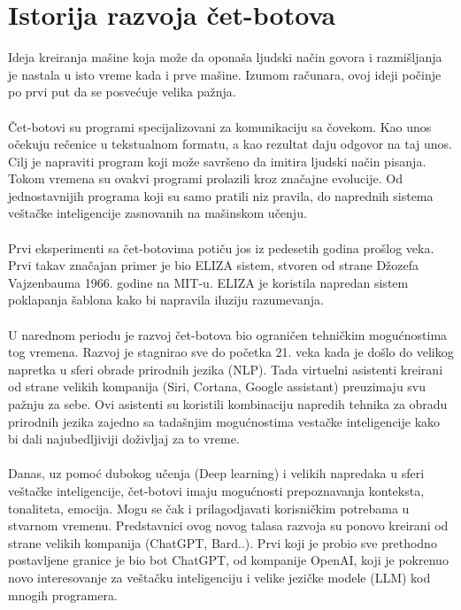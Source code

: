 \documentclass[fleqn, 12pt]{article}
\begin{document}


\setcounter{tocdepth}{2}
\tableofcontents

\newpage

\section{Istorija razvoja čet-botova}
\begin{text}
Ideja kreiranja mašine koja može da oponaša ljudski način govora i razmišljanja je nastala u isto vreme kada i prve mašine. Izumom računara, ovoj ideji počinje po prvi put da se posvećuje velika pažnja.\cite{G1}
\\\\
Čet-botovi su programi specijalizovani za komunikaciju sa čovekom. Kao unos očekuju rečenice u tekstualnom formatu, a kao rezultat daju odgovor na taj unos. Cilj je napraviti program koji može savršeno da imitira ljudski način pisanja. Tokom vremena su ovakvi programi prolazili kroz značajne evolucije. Od jednostavnijih programa koji su samo pratili niz pravila, do naprednih sistema veštačke inteligencije zasnovanih na mašinskom učenju. \cite{G1}
\\\\
Prvi eksperimenti sa čet-botovima potiču jos iz pedesetih godina prošlog veka. Prvi takav značajan primer je bio ELIZA sistem, stvoren od strane Džozefa Vajzenbauma 1966. godine na MIT-u. ELIZA je koristila napredan sistem poklapanja šablona kako bi napravila iluziju razumevanja.\cite{G1, G2, G3}
\\\\
U narednom periodu je razvoj čet-botova bio ograničen tehničkim mogućnostima tog vremena. Razvoj je stagnirao sve do početka 21. veka kada je došlo do velikog napretka u sferi obrade prirodnih jezika (NLP). Tada virtuelni asistenti kreirani od strane velikih kompanija (Siri, Cortana, Google assistant) preuzimaju svu pažnju za sebe. Ovi asistenti su koristili kombinaciju napredih tehnika za obradu prirodnih jezika zajedno sa tadašnjim mogućnostima vestačke inteligencije kako bi dali najubedljiviji doživljaj za to vreme.\cite{G1}
\\\\
Danas, uz pomoć dubokog učenja (Deep learning) i velikih napredaka u sferi veštačke inteligencije, čet-botovi imaju mogućnosti prepoznavanja konteksta, tonaliteta, emocija. Mogu se čak i prilagodjavati korisničkim potrebama u stvarnom vremenu. Predstavnici ovog novog talasa razvoja su ponovo kreirani od strane velikih kompanija (ChatGPT, Bard..). Prvi koji je probio sve prethodno postavljene granice je bio bot ChatGPT, od kompanije OpenAI, koji je pokrenuo novo interesovanje za veštačku inteligenciju i velike jezičke modele (LLM) kod mnogih programera.\cite{G1}
\end{text}
\newpage
\end{document}
